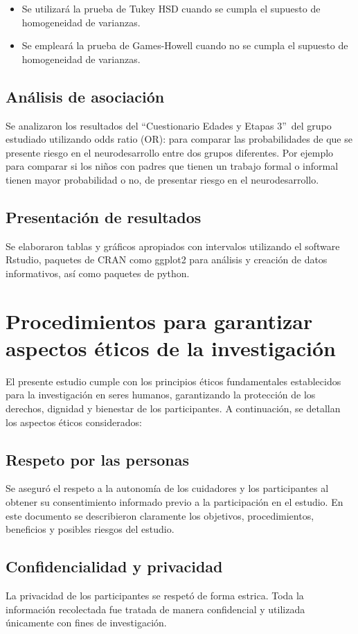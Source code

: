 \documentclass[11pt,letterpaper]{report}
\newcommand{\asq}{“Cuestionario Edades y Etapas 3”}
\begin{document}
\begin{itemize}
    \item Se utilizará la prueba de Tukey HSD cuando se cumpla el supuesto de
    homogeneidad de varianzas.
    \item Se empleará la prueba de Games-Howell cuando no se cumpla el supuesto
    de homogeneidad de varianzas.
\end{itemize}

\subsection{Análisis de asociación}
Se analizaron los resultados del \asq\ del grupo estudiado utilizando odds
ratio (OR): para comparar las probabilidades de que se presente riesgo en el
neurodesarrollo entre dos grupos diferentes. Por ejemplo para comparar si los
niños con padres que tienen un trabajo formal o informal tienen mayor
probabilidad o no, de presentar riesgo en el neurodesarrollo.

\subsection{Presentación de resultados}
Se elaboraron tablas y gráficos apropiados con intervalos utilizando el
software Rstudio, paquetes de CRAN como ggplot2 para análisis y creación de
datos informativos, así como paquetes de python.

\section{Procedimientos para garantizar aspectos éticos de la investigación}
El presente estudio cumple con los principios éticos fundamentales establecidos
para la investigación en seres humanos, garantizando la protección de los
derechos, dignidad y bienestar de los participantes. A continuación, se
detallan los aspectos éticos considerados:

\subsection{Respeto por las personas}
Se aseguró el respeto a la autonomía de los cuidadores y los participantes al
obtener su consentimiento informado previo a la participación en el estudio.
En este documento se describieron claramente los objetivos, procedimientos,
beneficios y posibles riesgos del estudio.

\subsection{Confidencialidad y privacidad}
La privacidad de los participantes se respetó de forma estrica. Toda la
información recolectada fue tratada de manera confidencial y utilizada
únicamente con fines de investigación.
\end{document}
